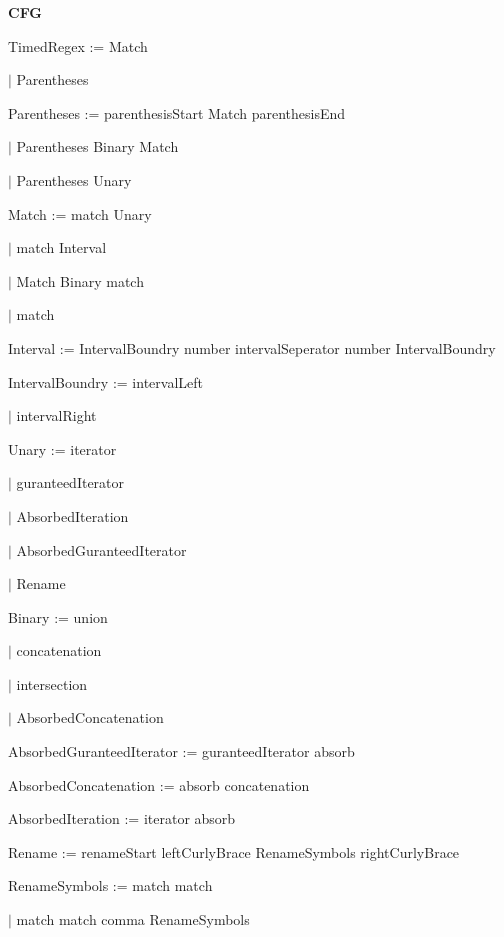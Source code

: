 
\textbf{CFG}

TimedRegex := Match

\qquad	$\mid$ Parentheses

Parentheses := parenthesisStart Match parenthesisEnd

\qquad	$\mid$ Parentheses Binary Match

\qquad	$\mid$ Parentheses Unary

Match := match Unary

\qquad	$\mid$ match Interval

\qquad    $\mid$ Match Binary match

\qquad	$\mid$ match

Interval := IntervalBoundry number intervalSeperator number IntervalBoundry

IntervalBoundry := intervalLeft

\qquad	$\mid$ intervalRight

Unary := iterator

\qquad	$\mid$ guranteedIterator

\qquad	$\mid$ AbsorbedIteration

\qquad	$\mid$ AbsorbedGuranteedIterator

\qquad	$\mid$ Rename

Binary := union

\qquad	$\mid$ concatenation

\qquad	$\mid$ intersection

\qquad	$\mid$ AbsorbedConcatenation

AbsorbedGuranteedIterator := guranteedIterator absorb 

AbsorbedConcatenation := absorb concatenation

AbsorbedIteration := iterator absorb 

Rename := renameStart leftCurlyBrace RenameSymbols rightCurlyBrace

RenameSymbols := match match

\qquad	$\mid$ match match comma RenameSymbols